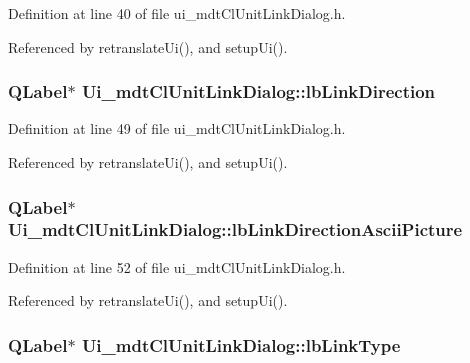 Definition at line 40 of file ui\-\_\-mdt\-Cl\-Unit\-Link\-Dialog.\-h.



Referenced by retranslate\-Ui(), and setup\-Ui().

\hypertarget{class_ui__mdt_cl_unit_link_dialog_a187f5c4b83a461eed99d15f035d5a7fa}{
\subsubsection[{lb\-Link\-Direction}]{\setlength{\rightskip}{0pt plus 5cm}Q\-Label$\ast$ Ui\-\_\-mdt\-Cl\-Unit\-Link\-Dialog\-::lb\-Link\-Direction}}\label{class_ui__mdt_cl_unit_link_dialog_a187f5c4b83a461eed99d15f035d5a7fa}


Definition at line 49 of file ui\-\_\-mdt\-Cl\-Unit\-Link\-Dialog.\-h.



Referenced by retranslate\-Ui(), and setup\-Ui().

\hypertarget{class_ui__mdt_cl_unit_link_dialog_aaa9992fad9b3f06e4305151ab66c0e26}{
\subsubsection[{lb\-Link\-Direction\-Ascii\-Picture}]{\setlength{\rightskip}{0pt plus 5cm}Q\-Label$\ast$ Ui\-\_\-mdt\-Cl\-Unit\-Link\-Dialog\-::lb\-Link\-Direction\-Ascii\-Picture}}\label{class_ui__mdt_cl_unit_link_dialog_aaa9992fad9b3f06e4305151ab66c0e26}


Definition at line 52 of file ui\-\_\-mdt\-Cl\-Unit\-Link\-Dialog.\-h.



Referenced by retranslate\-Ui(), and setup\-Ui().

\hypertarget{class_ui__mdt_cl_unit_link_dialog_aa441f76b8c0e0aa058808424275abdd5}{
\subsubsection[{lb\-Link\-Type}]{\setlength{\rightskip}{0pt plus 5cm}Q\-Label$\ast$ Ui\-\_\-mdt\-Cl\-Unit\-Link\-Dialog\-::lb\-Link\-Type}}\label{class_ui__mdt_cl_unit_link_dialog_aa441f76b8c0e0aa058808424275abdd5}


